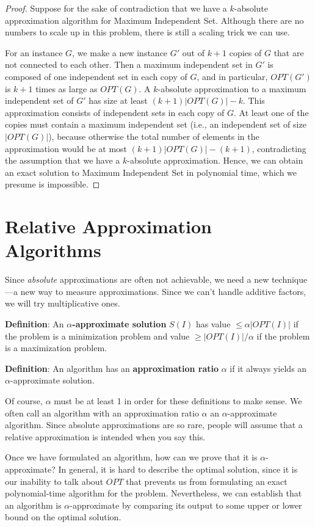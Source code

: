 \documentclass{article}
\begin{document}
\begin{proof}
Suppose for the sake of contradiction that we have a $k$-absolute
approximation algorithm for Maximum Independent Set.  Although there
are no numbers to scale up in this problem, there is still a scaling
trick we can use.

For an instance $G$, we make a new instance $G'$ out of $k+1$ copies
of $G$ that are not connected to each other.  Then a maximum
independent set in $G'$ is composed of one independent set in each
copy of $G$, and in particular, $OPT(G')$ is $k+1$ times as large as
$OPT(G)$.  A $k$-absolute approximation to a maximum independent set
of $G'$ has size at least $(k+1)|OPT(G)|-k$.  This approximation
consists of independent sets in each copy of $G$.  At least one of the
copies must contain a maximum independent set (i.e., an independent
set of size $|OPT(G)|$), because otherwise the total number of
elements in the approximation would be at most $(k+1)|OPT(G)| -
(k+1)$, contradicting the assumption that we have a $k$-absolute
approximation.  Hence, we can obtain an exact solution to Maximum
Independent Set in polynomial time, which we presume is impossible.
\end{proof}

\section{Relative Approximation Algorithms}

Since \textit{absolute} approximations are often not achievable, we
need a new technique---a new way to measure approximations.  Since
we can't handle additive factors, we will try multiplicative ones.

\textbf{Definition}:
An {\boldmath$\alpha$}\textbf{-approximate solution} $S(I)$ has value
$\le \alpha|OPT(I)|$ if the problem is a minimization problem and
value $\ge |OPT(I)|/\alpha$ if the problem is a maximization problem.

\textbf{Definition}:
An algorithm has an \textbf{approximation ratio} $\alpha$ if it
always yields an $\alpha$-approximate solution.

Of course, $\alpha$ must be at least 1 in order for these definitions
to make sense.  We often call an algorithm with an approximation ratio
$\alpha$ an $\alpha$-approximate algorithm.  Since absolute
approximations are so rare, people will assume that a relative
approximation is intended when you say this.

Once we have formulated an algorithm, how can we prove that it is
$\alpha$-approximate?  In general, it is hard to describe the optimal
solution, since it is our inability to talk about $OPT$ that prevents
us from formulating an exact polynomial-time algorithm for the
problem.  Nevertheless, we can establish that an algorithm is
$\alpha$-approximate by comparing its output to some upper or lower
bound on the optimal solution.
\end{document}
